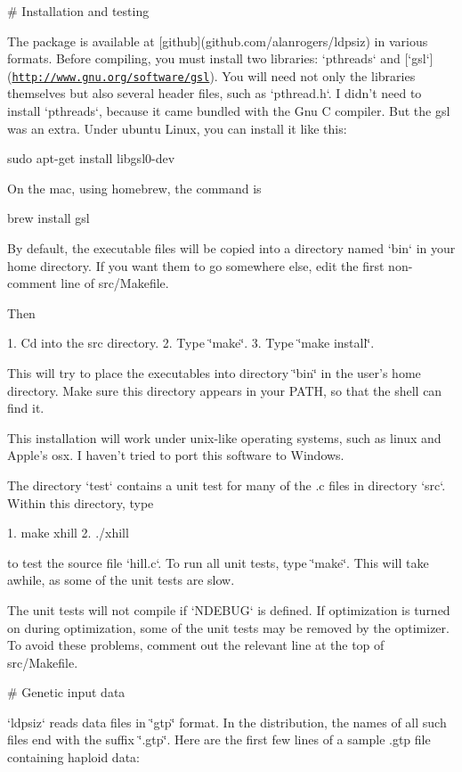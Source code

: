 \# \-Installation and testing

\-The package is available at \mbox{[}github\mbox{]}(github.\-com/alanrogers/ldpsiz) in various formats. \-Before compiling, you must install two libraries\-: `pthreads` and \mbox{[}`gsl`\mbox{]}(\href{http://www.gnu.org/software/gsl}{\tt http\-://www.\-gnu.\-org/software/gsl}). \-You will need not only the libraries themselves but also several header files, such as `pthread.h`. \-I didn't need to install `pthreads`, because it came bundled with the \-Gnu \-C compiler. \-But the gsl was an extra. \-Under ubuntu \-Linux, you can install it like this\-:

sudo apt-\/get install libgsl0-\/dev

\-On the mac, using homebrew, the command is

brew install gsl

\-By default, the executable files will be copied into a directory named `bin` in your home directory. \-If you want them to go somewhere else, edit the first non-\/comment line of src/\-Makefile.

\-Then

1. \-Cd into the src directory. 2. \-Type \char`\"{}make\char`\"{}. 3. \-Type \char`\"{}make install\char`\"{}.

\-This will try to place the executables into directory \char`\"{}bin\char`\"{} in the user's home directory. \-Make sure this directory appears in your \-P\-A\-T\-H, so that the shell can find it.

\-This installation will work under unix-\/like operating systems, such as linux and \-Apple's osx. \-I haven't tried to port this software to \-Windows.

\-The directory `test` contains a unit test for many of the .c files in directory `src`. \-Within this directory, type

1. make xhill 2. ./xhill

to test the source file `hill.c`. \-To run all unit tests, type \char`\"{}make\char`\"{}. \-This will take awhile, as some of the unit tests are slow.

\-The unit tests will not compile if `\-N\-D\-E\-B\-U\-G` is defined. \-If optimization is turned on during optimization, some of the unit tests may be removed by the optimizer. \-To avoid these problems, comment out the relevant line at the top of src/\-Makefile.

\# \-Genetic input data

`ldpsiz` reads data files in \char`\"{}gtp\char`\"{} format. \-In the distribution, the names of all such files end with the suffix \char`\"{}.\-gtp\char`\"{}. \-Here are the first few lines of a sample .gtp file containing haploid data\-:

